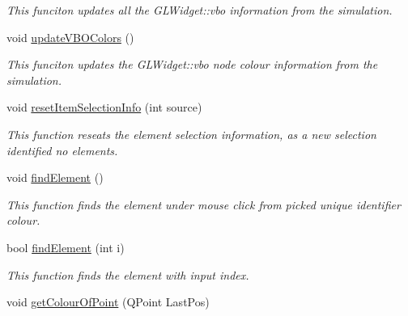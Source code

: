 \begin{DoxyCompactItemize}
\begin{DoxyCompactList}\small\item\em This funciton updates all the G\+L\+Widget\+::vbo information from the simulation. \end{DoxyCompactList}\item 
\hypertarget{classGLWidget_a0add0176392582cc3db892bcf88b736a}{}void \hyperlink{classGLWidget_a0add0176392582cc3db892bcf88b736a}{update\+V\+B\+O\+Colors} ()\label{classGLWidget_a0add0176392582cc3db892bcf88b736a}

\begin{DoxyCompactList}\small\item\em This funciton updates the G\+L\+Widget\+::vbo node colour information from the simulation. \end{DoxyCompactList}\item 
\hypertarget{classGLWidget_a4aba027a507e84b880acd641275165d4}{}void \hyperlink{classGLWidget_a4aba027a507e84b880acd641275165d4}{reset\+Item\+Selection\+Info} (int source)\label{classGLWidget_a4aba027a507e84b880acd641275165d4}

\begin{DoxyCompactList}\small\item\em This function reseats the element selection information, as a new selection identified no elements. \end{DoxyCompactList}\item 
\hypertarget{classGLWidget_a7fe217738ad7d4c54caa575068641234}{}void \hyperlink{classGLWidget_a7fe217738ad7d4c54caa575068641234}{find\+Element} ()\label{classGLWidget_a7fe217738ad7d4c54caa575068641234}

\begin{DoxyCompactList}\small\item\em This function finds the element under mouse click from picked unique identifier colour. \end{DoxyCompactList}\item 
\hypertarget{classGLWidget_aa1c349f897d0fee1163abba8fd39995c}{}bool \hyperlink{classGLWidget_aa1c349f897d0fee1163abba8fd39995c}{find\+Element} (int i)\label{classGLWidget_aa1c349f897d0fee1163abba8fd39995c}

\begin{DoxyCompactList}\small\item\em This function finds the element with input index. \end{DoxyCompactList}\item 
\hypertarget{classGLWidget_afc09ab8fa7a8163ca1b69e7953e33dc4}{}void \hyperlink{classGLWidget_afc09ab8fa7a8163ca1b69e7953e33dc4}{get\+Colour\+Of\+Point} (Q\+Point Last\+Pos)\label{classGLWidget_afc09ab8fa7a8163ca1b69e7953e33dc4}


\end{DoxyCompactItemize}

